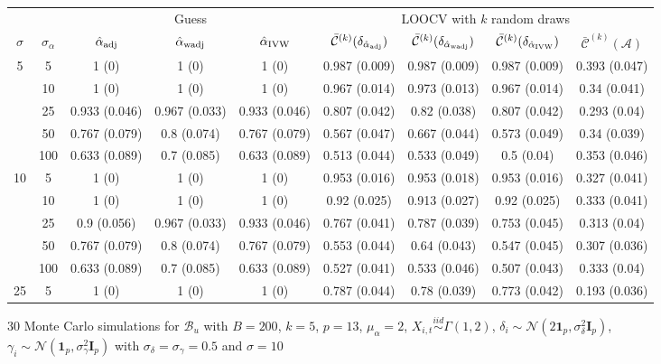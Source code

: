 \documentclass[10pt]{article}
\newcommand{\simiid}{\stackrel{iid}{\sim}} %
\def\normal#1#2{\mathcal{N}(#1,#2)} %
\def\mc#1{\mathcal{#1}} %
\theoremstyle{definition}
\begin{document}
\begin{sidewaysfigure}
\centering
\caption{30 Monte Carlo simulations  for $\mc{B}_u$ with $B = 200$, $k = 5$, $p = 13$, $\mu_{\alpha}=2$, $X_{i,t} \simiid \Gamma(1,2)$, $\delta_i \sim \normal{2\mathbf{1}_p}{\sigma^2_{\delta}\mathbf{I}_p}$, $\gamma_i \sim \normal{\mathbf{1}_p}{\sigma^2_{\gamma}\mathbf{I}_p}$ with $\sigma_{\delta}=\sigma_{\gamma}=0.5$ and $\sigma = 10$}
\begin{tabular}{cc|ccc|cccc}
   &   & \multicolumn{3}{|c|}{Guess} & \multicolumn{4}{|c}{LOOCV with $k$ random draws}  \\ 
 $\sigma$   & $\sigma_{\alpha}$ &  $\hat{\alpha}_{\rm adj}$  & $\hat{\alpha}_{\rm wadj}$ & $\hat{\alpha}_{\rm IVW}$  & $\bar{\mc{C}}^{(k)}(\delta_{\hat{\alpha}_{\rm adj}})$  & $\bar{\mc{C}}^{(k)}(\delta_{\hat{\alpha}_{\rm wadj}})$ & $\bar{\mc{C}}^{(k)}(\delta_{\hat{\alpha}_{\rm IVW}})$ &  $\bar{\mc{C}}^{(k)}(\mc{A})$ \\[.3cm]  
  \hline
 \multirow{5}{*}{5} & 5  & 1 (0) & 1 (0) & 1 (0) & 0.987 (0.009) & 0.987 (0.009) & 0.987 (0.009) & 0.393 (0.047) \\ 
    & 10  & 1 (0) & 1 (0) & 1 (0) & 0.967 (0.014) & 0.973 (0.013) & 0.967 (0.014) & 0.34 (0.041) \\ 
    & 25  & 0.933 (0.046) & 0.967 (0.033) & 0.933 (0.046) & 0.807 (0.042) & 0.82 (0.038) & 0.807 (0.042) & 0.293 (0.04) \\ 
    & 50  & 0.767 (0.079) & 0.8 (0.074) & 0.767 (0.079) & 0.567 (0.047) & 0.667 (0.044) & 0.573 (0.049) & 0.34 (0.039) \\ 
    & 100  & 0.633 (0.089) & 0.7 (0.085) & 0.633 (0.089) & 0.513 (0.044) & 0.533 (0.049) & 0.5 (0.04) & 0.353 (0.046) \\[.3cm] 
   \multirow{5}{*}{10} & 5  & 1 (0) & 1 (0) & 1 (0) & 0.953 (0.016) & 0.953 (0.018) & 0.953 (0.016) & 0.327 (0.041) \\ 
    & 10  & 1 (0) & 1 (0) & 1 (0) & 0.92 (0.025) & 0.913 (0.027) & 0.92 (0.025) & 0.333 (0.041) \\ 
    & 25  & 0.9 (0.056) & 0.967 (0.033) & 0.933 (0.046) & 0.767 (0.041) & 0.787 (0.039) & 0.753 (0.045) & 0.313 (0.04) \\ 
    & 50  & 0.767 (0.079) & 0.8 (0.074) & 0.767 (0.079) & 0.553 (0.044) & 0.64 (0.043) & 0.547 (0.045) & 0.307 (0.036) \\ 
    & 100  & 0.633 (0.089) & 0.7 (0.085) & 0.633 (0.089) & 0.527 (0.041) & 0.533 (0.046) & 0.507 (0.043) & 0.333 (0.04) \\[.3cm] 
   \multirow{5}{*}{25}  & 5  & 1 (0) & 1 (0) & 1 (0) & 0.787 (0.044) & 0.78 (0.039) & 0.773 (0.042) & 0.193 (0.036) \\ 

\end{tabular}
\end{sidewaysfigure}
\end{document}
